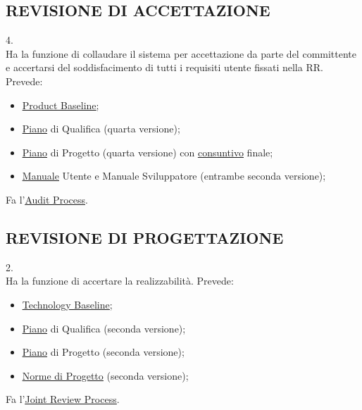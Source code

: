 		\subsection{REVISIONE DI ACCETTAZIONE}  \label{RA} 
		4. \\
		Ha la funzione di collaudare il sistema per accettazione da parte del committente e accertarsi del soddisfacimento di tutti i requisiti utente fissati nella RR.
		Prevede:
		\begin{itemize}
			\item \underline{\hyperref[productbaseline]{Product Baseline}};
			\item \underline{\hyperref[piano]{Piano}} di Qualifica (quarta versione);
			\item \underline{\hyperref[piano]{Piano}} di Progetto (quarta versione) con \underline{\hyperref[consuntivo]{consuntivo}} finale;
			\item \underline{\hyperref[manuali]{Manuale}} Utente e Manuale Sviluppatore (entrambe seconda versione);
		\end{itemize}
		Fa l'\underline{\hyperref[audit]{Audit Process}}.
		
		\subsection{REVISIONE DI PROGETTAZIONE}	 \label{RP}
		2. \\
		Ha la funzione di accertare la realizzabilità.
		Prevede:
		\begin{itemize}
			\item \underline{\hyperref[technologybaseline]{Technology Baseline}};
			\item \underline{\hyperref[piano]{Piano}} di Qualifica (seconda versione);
			\item \underline{\hyperref[piano]{Piano}} di Progetto (seconda versione);
			\item \underline{\hyperref[norme]{Norme di Progetto}} (seconda versione);
		\end{itemize}
		Fa l'\underline{\hyperref[joint]{Joint Review Process}}.
		

